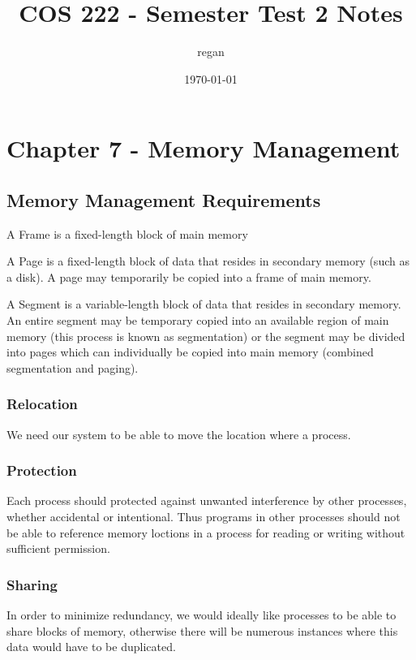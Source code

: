 \documentclass[11pt]{article}
\author{regan}
\date{\today}
\title{COS 222 - Semester Test 2 Notes}
\begin{document}
\maketitle
\tableofcontents


\section{Chapter 7 - Memory Management}
\label{sec-1}

\subsection{Memory Management Requirements}
\label{sec-1-1}

A Frame is a fixed-length block of main memory

A Page is a fixed-length block of data that resides in
secondary memory (such as a disk). A page may temporarily
be copied into a frame of main memory.

A Segment is a variable-length block of data that resides
in secondary memory. An entire segment may be temporary
copied into an available region of main memory (this process
is known as segmentation) or the segment may be divided into
pages which can individually be copied into main memory
(combined segmentation and paging).

\subsubsection{Relocation}
\label{sec-1-1-1}

We need our system to be able to move the location where a
process.

\subsubsection{Protection}
\label{sec-1-1-2}

Each process should protected against unwanted interference
by other processes, whether accidental or intentional. Thus
programs in other processes should not be able to reference
memory loctions in a process for reading or writing without
sufficient permission.

\subsubsection{Sharing}
\label{sec-1-1-3}

In order to minimize redundancy, we would ideally like 
processes to be able to share blocks of memory, otherwise
there will be numerous instances where this data would have
to be duplicated.
\end{document}
